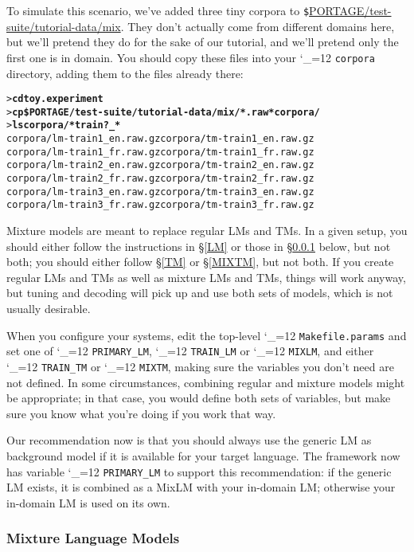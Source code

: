 \documentclass[11pt,letterpaper]{article}
\def\code{\begingroup\catcode`\_=12 \codex}
\newcommand{\codex}[1]{\texttt{#1}\endgroup}
\begin{document}
To simulate this scenario, we've added three tiny corpora to
\verb"$"\url{PORTAGE/test-suite/tutorial-data/mix}.
They don't actually come from different domains here, but we'll pretend they do
for the sake of our tutorial, and we'll pretend only the first one is in
domain.  You should copy these files into your \code{corpora} directory, adding
them to the files already there:
\begin{small}
\begin{alltt}
   > \textbf{cd toy.experiment}
   > \textbf{cp \$PORTAGE/test-suite/tutorial-data/mix/*.raw* corpora/}
   > \textbf{ls corpora/*train?_*}
   corpora/lm-train1_en.raw.gz  corpora/tm-train1_en.raw.gz
   corpora/lm-train1_fr.raw.gz  corpora/tm-train1_fr.raw.gz
   corpora/lm-train2_en.raw.gz  corpora/tm-train2_en.raw.gz
   corpora/lm-train2_fr.raw.gz  corpora/tm-train2_fr.raw.gz
   corpora/lm-train3_en.raw.gz  corpora/tm-train3_en.raw.gz
   corpora/lm-train3_fr.raw.gz  corpora/tm-train3_fr.raw.gz
   \end{alltt}
\end{small}

Mixture models are meant to replace regular LMs and TMs. In a given setup, you
should either follow the instructions in \S\ref{LM} or those in \S\ref{MIXLM}
below, but not both; you should either follow \S\ref{TM} or \S\ref{MIXTM}, but
not both.  If you create regular LMs and
TMs as well as mixture LMs and TMs, things will work anyway, but tuning and
decoding will pick up and use both sets of models, which is not usually
desirable.

When you configure your systems, edit the top-level \code{Makefile.params} and
set one of \code{PRIMARY_LM}, \code{TRAIN_LM} or \code{MIXLM}, and either \code{TRAIN_TM} or
\code{MIXTM}, making sure the variables you don't need are not defined. In some
circumstances, combining regular and mixture models might be appropriate; in
that case, you would define both sets of variables, but make sure you know what
you're doing if you work that way.

Our recommendation now is that you should always use the generic LM as
background model if it is available for your target language.  The framework
now has variable \code{PRIMARY_LM} to support this recommendation: if the generic
LM exists, it is combined as a MixLM with your in-domain LM; otherwise your
in-domain LM is used on its own.

\subsubsection{Mixture Language Models} \label{MIXLM}
\end{document}
